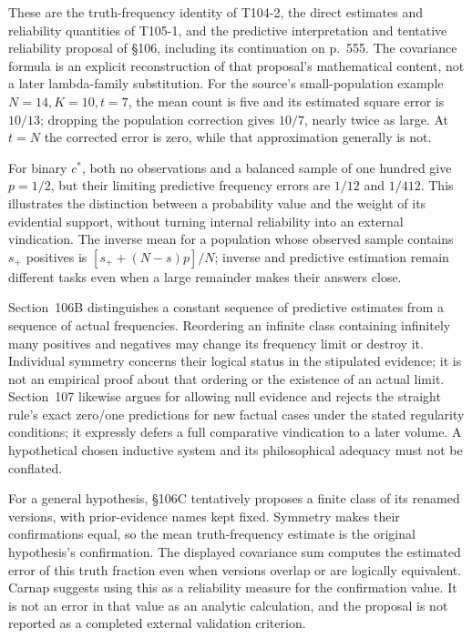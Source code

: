 These are the truth-frequency identity of T104-2, the direct estimates
and reliability quantities of T105-1, and the predictive interpretation
and tentative reliability proposal of §106, including its continuation
on p.~555. The covariance formula is an explicit reconstruction of
that proposal's mathematical content, not a later lambda-family
substitution. For the source's small-population example
\(N=14,K=10,t=7\), the mean count is five and its estimated
square error is \(10/13\); dropping the population correction gives
\(10/7\), nearly twice as large. At \(t=N\) the corrected error
is zero, while that approximation generally is not.

For binary \(c^*\), both no observations and a balanced sample
of one hundred give \(p=1/2\), but their limiting predictive
frequency errors are \(1/12\) and \(1/412\). This illustrates
the distinction between a probability value and the weight of its
evidential support, without turning internal reliability into an external
vindication. The inverse mean for a population whose observed sample
contains \(s_+\) positives is
\([s_++(N-s)p]/N\); inverse and predictive estimation remain
different tasks even when a large remainder makes their answers close.

Section~106B distinguishes a constant sequence of predictive estimates
from a sequence of actual frequencies. Reordering an infinite class
containing infinitely many positives and negatives may change its
frequency limit or destroy it. Individual symmetry concerns their logical
status in the stipulated evidence; it is not an empirical proof about
that ordering or the existence of an actual limit. Section~107 likewise
argues for allowing null evidence and rejects the straight rule's exact
zero/one predictions for new factual cases under the stated regularity
conditions; it expressly defers a full comparative vindication to a later
volume. A hypothetical chosen inductive system and its philosophical
adequacy must not be conflated.

For a general hypothesis, §106C tentatively proposes a finite class
of its renamed versions, with prior-evidence names kept fixed. Symmetry
makes their confirmations equal, so the mean truth-frequency estimate
is the original hypothesis's confirmation. The displayed covariance
sum computes the estimated error of this truth fraction even when
versions overlap or are logically equivalent. Carnap suggests using
this as a reliability measure for the confirmation value. It is not
an error in that value as an analytic calculation, and the proposal
is not reported as a completed external validation criterion.

